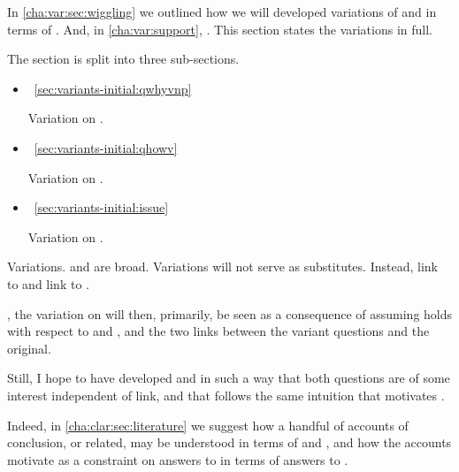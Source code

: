 \begin{note}
  In \autoref{cha:var:sec:wiggling} we outlined how we will developed variations of \qWhy{} and \qHow{} in terms of \ros{}.
  And, in \autoref{cha:var:support}, \support{}.
  This section states the variations in full.

  The section is split into three sub-sections.

  \begin{itemize}
  \item
    \qWhyVnP{}%
    \mbox{ }\hfill\autoref{sec:variants-initial:qwhyvnp}

    Variation on \qWhy{}.
  \item
    \qHowV{}%
    \mbox{ }\hfill\autoref{sec:variants-initial:qhowv}

    Variation on \qHow{}.
  \item
    \issueConstraint{}%
    \mbox{ }\hfill\autoref{sec:variants-initial:issue}

    Variation on \issueInclusion{}.
  \end{itemize}

  Variations.
  \qWhy{} and \qHow{} are broad.
  Variations will not serve as substitutes.
  Instead, link \qWhyVnP{} to \qWhy{} and link \qHowV{} to \qHow{}.

  \issueConstraint{}, the variation on \issueInclusion{} will then, primarily, be seen as a consequence of assuming \issueInclusion{} holds with respect to \qWhy{} and \qHow{}, and the two links between the variant questions and the original.

  Still, I hope to have developed \qWhyVnP{} and \qHowV{} in such a way that both questions are of some interest independent of link, and that \issueConstraint{} follows the same intuition that motivates \issueInclusion{}.

  Indeed, in \autoref{cha:clar:sec:literature} we suggest how a handful of accounts of conclusion, or related, may be understood in terms of \qWhyVnP{} and \qHowV{}, and how the accounts motivate \issueConstraint{} as a constraint on answers to \qWhyVnP{} in terms of answers to \qHowV{}.

\end{note}

\subsection{\qWhyVnP{}}
\label{sec:variants-initial:qwhyvnp}

